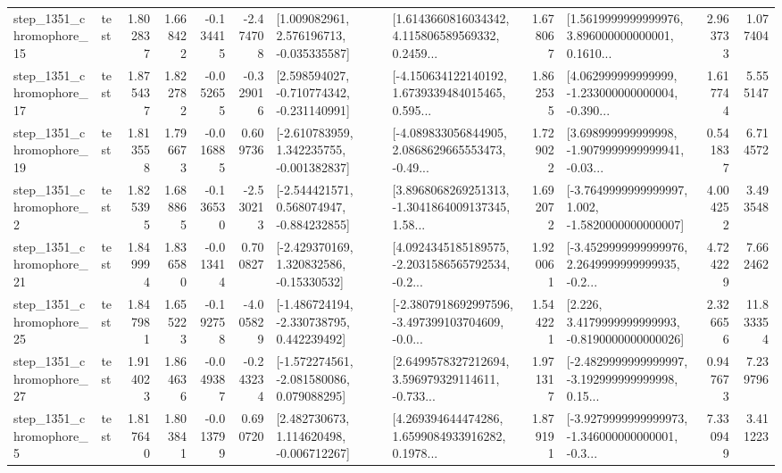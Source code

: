 \begin{tabular}{llrrrrllrlrr}
 step\_1351\_chromophore\_15 &      test &      1.802837 &    1.668422 &     -0.134415 & -2.474708 &    [1.009082961, 2.576196713, -0.035335587] &  [1.6143660816034342, 4.115806589569332, 0.2459... &       1.678067 &  [1.5619999999999976, 3.896000000000001, 0.1610... &            2.963733 &          1.077404 \\
 step\_1351\_chromophore\_17 &      test &      1.875437 &    1.822782 &     -0.052655 & -0.329016 &   [2.598594027, -0.710774342, -0.231140991] &  [-4.150634122140192, 1.6739339484015465, 0.595... &       1.862535 &  [4.062999999999999, -1.233000000000004, -0.390... &            1.617744 &          5.555147 \\
 step\_1351\_chromophore\_19 &      test &      1.813558 &    1.796673 &     -0.016885 &  0.609736 &   [-2.610783959, 1.342235755, -0.001382837] &  [-4.089833056844905, 2.0868629665553473, -0.49... &       1.729022 &  [3.698999999999998, -1.9079999999999941, -0.03... &            0.541837 &          6.714572 \\
  step\_1351\_chromophore\_2 &      test &      1.825395 &    1.688865 &     -0.136530 & -2.530213 &   [-2.544421571, 0.568074947, -0.884232855] &  [3.8968068269251313, -1.3041864009137345, 1.58... &       1.692072 &  [-3.7649999999999997, 1.002, -1.5820000000000007] &            4.004252 &          3.493548 \\
 step\_1351\_chromophore\_21 &      test &      1.849994 &    1.836580 &     -0.013414 &  0.700827 &    [-2.429370169, 1.320832586, -0.15330532] &  [4.0924345185189575, -2.2031586565792534, -0.2... &       1.920061 &  [-3.4529999999999976, 2.2649999999999935, -0.2... &            4.724229 &          7.662462 \\
 step\_1351\_chromophore\_25 &      test &      1.847981 &    1.655223 &     -0.192758 & -4.005829 &   [-1.486724194, -2.330738795, 0.442239492] &  [-2.3807918692997596, -3.497399103704609, -0.0... &       1.544221 &   [2.226, 3.4179999999999993, -0.8190000000000026] &            2.326656 &         11.833354 \\
 step\_1351\_chromophore\_27 &      test &      1.914023 &    1.864636 &     -0.049387 & -0.243234 &   [-1.572274561, -2.081580086, 0.079088295] &  [2.6499578327212694, 3.596979329114611, -0.733... &       1.971317 &  [-2.4829999999999997, -3.192999999999998, 0.15... &            0.947673 &          7.239796 \\
  step\_1351\_chromophore\_5 &      test &      1.817640 &    1.803841 &     -0.013799 &  0.690720 &    [2.482730673, 1.114620498, -0.006712267] &  [4.269394644474286, 1.6599084933916282, 0.1978... &       1.879191 &  [-3.9279999999999973, -1.346000000000001, -0.3... &            7.330949 &          3.411223 \\

\end{tabular}
